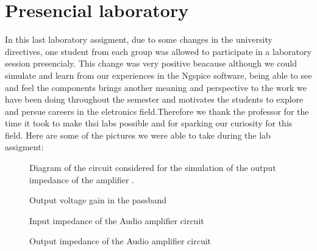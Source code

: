 \section{Presencial laboratory}
\label{sec:Presencial}

In this last laboratory assigment, due to some changes in the university directives, one student from each group was allowed to participate in a laboratory session presencialy. This change was very positive beacause although we could simulate and learn from our experiences in the Ngspice software, being able to see and feel the components brings another meaning and perspective to the work we have been doing throughout the semester and motivates the students to explore and persue careers in the eletronics field.Therefore we thank the professor for the time it took to make thsi labs possible and for sparking our curiosity for this field. Here are some of the pictures we were able to take during the lab assigment:  

\begin{figure}[H] \centering
\vspace{-10cm}
\caption{Diagram of the circuit considered for the simulation of the output impedance of the amplifier .}
\label{fig:diagram_t4_zout}
\end{figure}

  
\begin{figure}[H] \centering
\vspace{-1cm}
\caption{Output voltage gain in the passband}
\label{fig:gain_sim}
\end{figure}


\begin{figure}[H] \centering
\caption{Input impedance of the Audio amplifier circuit}
\label{fig:In_imp}
\end{figure}
\vspace{-3cm}


\begin{figure}[H] \centering
\caption{Output impedance of the Audio amplifier circuit}
\label{fig:out_imp}
\end{figure}
\vspace{-3cm}


\pagebreak
